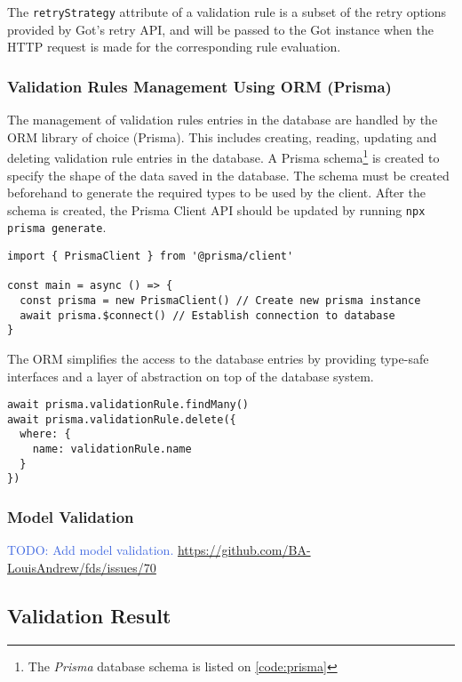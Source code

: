      The \verb;retryStrategy; attribute of a validation rule is a subset of the retry options provided by Got's retry API, and will be passed to the Got instance when the HTTP request is made for the corresponding rule evaluation. 

    \subsubsection{Validation Rules Management Using ORM (Prisma)} 
      The management of validation rules entries in the database are handled by the ORM library of choice (Prisma). This includes creating, reading, updating and deleting validation rule entries in the database. A Prisma schema\footnote{The \emph{Prisma} database schema is listed on \autoref{code:prisma}} is created to specify the shape of the data saved in the database. The schema must be created beforehand to generate the required types to be used by the client. After the schema is created, the Prisma Client API should be updated by running \verb;npx prisma generate;. 

      \begin{lstlisting}[style=es6, caption={Establishing database connection with Prisma (TypeScript)}]
import { PrismaClient } from '@prisma/client'

const main = async () => {
  const prisma = new PrismaClient() // Create new prisma instance
  await prisma.$connect() // Establish connection to database
}
      \end{lstlisting}  

      The ORM simplifies the access to the database entries by providing type-safe interfaces and a layer of abstraction on top of the database system. 

      \begin{lstlisting}[style=es6, caption={Example usage of Prisma (TypeScript)}]
await prisma.validationRule.findMany()
await prisma.validationRule.delete({
  where: {
    name: validationRule.name
  }
})
      \end{lstlisting}

    \subsubsection{Model Validation}
      \textcolor{royalblue}{TODO: Add model validation. \url{https://github.com/BA-LouisAndrew/fds/issues/70}}

  \subsection{Validation Result}
  

